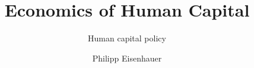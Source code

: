 

\title{Economics of Human Capital}
\subtitle{\vspace{0.3cm}Human capital policy}
\author{Philipp Eisenhauer}

\date{}

\let\otp\titlepage
